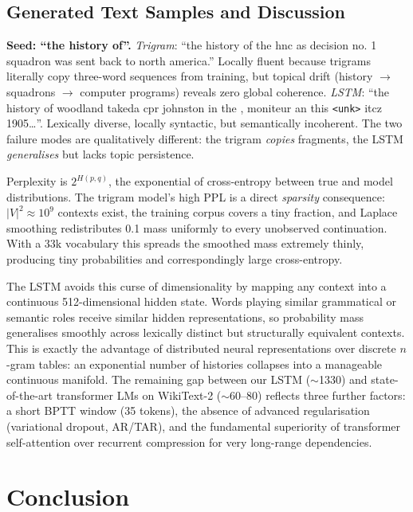 \documentclass[11pt,a4paper]{article}
\begin{document}
\subsection{Generated Text Samples and Discussion}
\textbf{Seed: ``the history of''.} \emph{Trigram}: ``the history of the hnc as decision no. 1 squadron was sent back to north america.'' Locally fluent because trigrams literally copy three-word sequences from training, but topical drift (history $\rightarrow$ squadrons $\rightarrow$ computer programs) reveals zero global coherence. \emph{LSTM}: ``the history of woodland takeda cpr johnston in the , moniteur an this \texttt{<unk>} itcz 1905\ldots''. Lexically diverse, locally syntactic, but semantically incoherent. The two failure modes are qualitatively different: the trigram \emph{copies} fragments, the LSTM \emph{generalises} but lacks topic persistence.

Perplexity is $2^{H(p,q)}$, the exponential of cross-entropy between true and model distributions. The trigram model's high PPL is a direct \emph{sparsity} consequence: $|V|^2 \approx 10^9$ contexts exist, the training corpus covers a tiny fraction, and Laplace smoothing redistributes 0.1 mass uniformly to every unobserved continuation. With a 33k vocabulary this spreads the smoothed mass extremely thinly, producing tiny probabilities and correspondingly large cross-entropy.

The LSTM avoids this curse of dimensionality by mapping any context into a continuous 512-dimensional hidden state. Words playing similar grammatical or semantic roles receive similar hidden representations, so probability mass generalises smoothly across lexically distinct but structurally equivalent contexts. This is exactly the advantage of distributed neural representations over discrete $n$-gram tables: an exponential number of histories collapses into a manageable continuous manifold. The remaining gap between our LSTM ($\sim$1330) and state-of-the-art transformer LMs on WikiText-2 ($\sim$60--80) reflects three further factors: a short BPTT window (35 tokens), the absence of advanced regularisation (variational dropout, AR/TAR), and the fundamental superiority of transformer self-attention over recurrent compression for very long-range dependencies.

\section{Conclusion}
\end{document}
